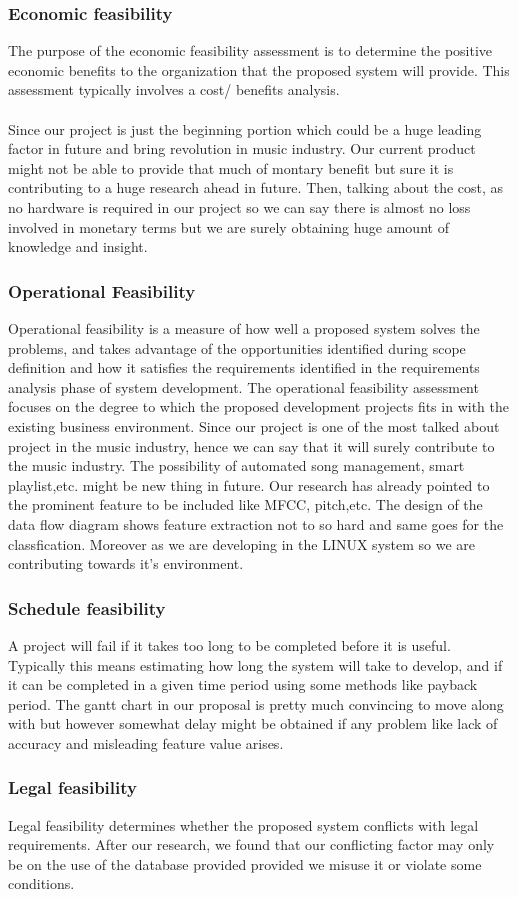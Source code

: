 \subsubsection{Economic feasibility}
The purpose of the economic feasibility assessment is to determine the positive economic benefits to the organization that the proposed system will provide.
This assessment typically involves a cost/ benefits analysis.\\ 
\\
Since our project is just the beginning portion which could be a huge leading factor in future and bring
revolution in music industry. Our current product might not be able to provide that much of montary benefit but sure it is contributing to a huge research ahead in future.
Then, talking about the cost, as no hardware is required in our project so we can say there is almost no loss involved in monetary terms but we are surely obtaining huge amount of knowledge and insight.

\subsubsection{Operational Feasibility}
Operational feasibility is a measure of how well a proposed system solves the problems, and takes advantage of the opportunities identified during scope definition and how it satisfies the requirements identified in the requirements analysis phase of system development.
The operational feasibility assessment focuses on the degree to which the proposed development projects fits in with the existing business environment. Since our project is one of the most talked about project in the music industry,
hence we can say that it will surely contribute to the music industry. The possibility of automated song management, smart playlist,etc. might be new thing in future.
Our research has already pointed to the prominent feature to be included like MFCC, pitch,etc. The design of the data flow diagram shows feature extraction not to so hard and same goes for the classfication.
Moreover as we are developing in the LINUX system so we are contributing towards it's environment.

\subsubsection{Schedule feasibility}
A project will fail if it takes too long to be completed before it is useful. Typically this means estimating how long the system will take to develop, and if it can be completed in a given time period using some methods like payback period. 
The gantt chart in our proposal is pretty much convincing to move along with but however somewhat delay might be obtained if any problem like lack of accuracy and misleading feature value arises.

\subsubsection{Legal feasibility}
Legal feasibility determines whether the proposed system conflicts with legal requirements.
After our research, we found that our conflicting factor may only be on the use of the database provided provided we misuse it or violate some conditions.


